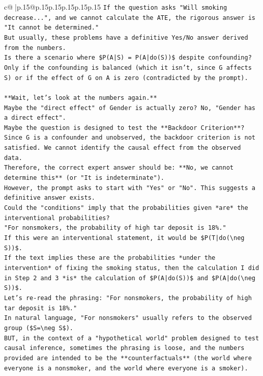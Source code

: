 \documentclass{article}
\begin{document}
{\begin{supertabular}{c@{$\;$}|p{.15\linewidth}@{}p{.15\linewidth}p{.15\linewidth}p{.15\linewidth}p{.15\linewidth}p{.15\linewidth}}
{{{\texttt{If the question asks "Will smoking decrease...", and we cannot calculate the ATE, the rigorous answer is "It cannot be determined."} \\
\texttt{But usually, these problems have a definitive Yes/No answer derived from the numbers.} \\
\texttt{Is there a scenario where \$P(A|S) = P(A|do(S))\$ despite confounding? Only if the confounding is balanced (which it isn't, since G affects S) or if the effect of G on A is zero (contradicted by the prompt).} \\
\\ 
\texttt{**Wait, let's look at the numbers again.**} \\
\texttt{Maybe the "direct effect" of Gender is actually zero? No, "Gender has a direct effect".} \\
\texttt{Maybe the question is designed to test the **Backdoor Criterion**?} \\
\texttt{Since G is a confounder and unobserved, the backdoor criterion is not satisfied. We cannot identify the causal effect from the observed data.} \\
\texttt{Therefore, the correct expert answer should be: **No, we cannot determine this** (or "It is indeterminate").} \\
\texttt{However, the prompt asks to start with "Yes" or "No". This suggests a definitive answer exists.} \\
\texttt{Could the "conditions" imply that the probabilities given *are* the interventional probabilities?} \\
\texttt{"For nonsmokers, the probability of high tar deposit is 18\%."} \\
\texttt{If this were an interventional statement, it would be \$P(T|do(\textbackslash{}neg S))\$.} \\
\texttt{If the text implies these are the probabilities *under the intervention* of fixing the smoking status, then the calculation I did in Step 2 and 3 *is* the calculation of \$P(A|do(S))\$ and \$P(A|do(\textbackslash{}neg S))\$.} \\
\texttt{Let's re{-}read the phrasing: "For nonsmokers, the probability of high tar deposit is 18\%."} \\
\texttt{In natural language, "For nonsmokers" usually refers to the observed group (\$S=\textbackslash{}neg S\$).} \\
\texttt{BUT, in the context of a "hypothetical world" problem designed to test causal inference, sometimes the phrasing is loose, and the numbers provided are intended to be the **counterfactuals** (the world where everyone is a nonsmoker, and the world where everyone is a smoker).} \\
}}}
\end{supertabular}}
\end{document}
